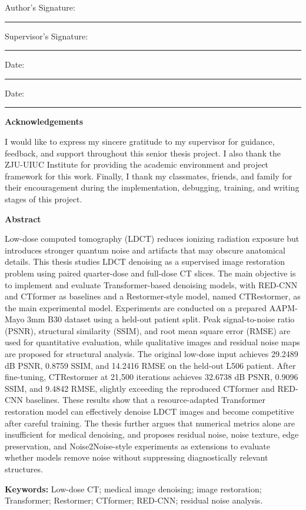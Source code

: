 \documentclass[12pt,a4paper]{report}
\newcommand{\fronttitle}[1]{%
  \clearpage
  \begin{center}
    {\bfseries\fontsize{24}{28}\selectfont #1}
  \end{center}
  \vspace{1em}
}
\newcommand{\signatureline}[1]{%
  \noindent #1\hspace{0.5em}\rule{0.32\textwidth}{0.4pt}
}
\begin{document}
\vspace{3em}
\signatureline{Author's Signature:}
\hfill
\signatureline{Supervisor's Signature:}

\vspace{2em}
\signatureline{Date:}
\hfill
\signatureline{Date:}

\fronttitle{Acknowledgements}

I would like to express my sincere gratitude to my supervisor for guidance, feedback, and support throughout this senior thesis project. I also thank the ZJU-UIUC Institute for providing the academic environment and project framework for this work. Finally, I thank my classmates, friends, and family for their encouragement during the implementation, debugging, training, and writing stages of this project.

\fronttitle{Abstract}

Low-dose computed tomography (LDCT) reduces ionizing radiation exposure but introduces stronger quantum noise and artifacts that may obscure anatomical details. This thesis studies LDCT denoising as a supervised image restoration problem using paired quarter-dose and full-dose CT slices. The main objective is to implement and evaluate Transformer-based denoising models, with RED-CNN and CTformer as baselines and a Restormer-style model, named CTRestormer, as the main experimental model. Experiments are conducted on a prepared AAPM-Mayo 3mm B30 dataset using a held-out patient split. Peak signal-to-noise ratio (PSNR), structural similarity (SSIM), and root mean square error (RMSE) are used for quantitative evaluation, while qualitative images and residual noise maps are proposed for structural analysis. The original low-dose input achieves 29.2489 dB PSNR, 0.8759 SSIM, and 14.2416 RMSE on the held-out L506 patient. After fine-tuning, CTRestormer at 21,500 iterations achieves 32.6738 dB PSNR, 0.9096 SSIM, and 9.4842 RMSE, slightly exceeding the reproduced CTformer and RED-CNN baselines. These results show that a resource-adapted Transformer restoration model can effectively denoise LDCT images and become competitive after careful training. The thesis further argues that numerical metrics alone are insufficient for medical denoising, and proposes residual noise, noise texture, edge preservation, and Noise2Noise-style experiments as extensions to evaluate whether models remove noise without suppressing diagnostically relevant structures.

\noindent\textbf{Keywords:} Low-dose CT; medical image denoising; image restoration; Transformer; Restormer; CTformer; RED-CNN; residual noise analysis.
\end{document}
